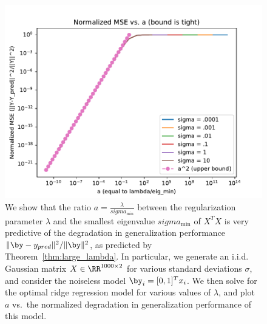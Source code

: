 \begin{figure}
	\begin{center}
		\centerline{\includegraphics[width=0.8\columnwidth]{figures/micro_large_sigma_min.pdf}}
		\caption{We show that the ratio $a=\frac{\lambda}{sigma_{\min}}$ between the regularization parameter $\lambda$ and the smallest eigenvalue $sigma_{\min}$ of $X^T X$ is very predictive of the degradation in generalization performance $\|\by - y_{pred}\|^2/\|\by\|^2$, as predicted by Theorem~\ref{thm:large_lambda}.
		In particular, we generate an i.i.d. Gaussian matrix $X\in \RR^{1000\times 2}$ for various standard deviations $\sigma$, and consider the noiseless model $\by_i = [0,1]^T x_i$.
		We then solve for the optimal ridge regression model for various values of $\lambda$, and plot $a$ vs.\ the normalized degradation in generalization performance of this model. 
		}
		\label{fig:micro_large_sigma_min}
	\end{center}
\end{figure}


